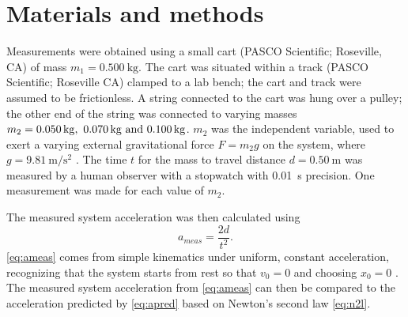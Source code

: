 ﻿\documentclass[reprint,amsmath,amssymb,aps]{revtex4-2}
\begin{document}
\section{Materials and methods}

Measurements were obtained using a small cart (PASCO Scientific; Roseville, CA) of mass $m_1=\qty{0.500}{\kilo\gram}$. The cart was situated within a track (PASCO Scientific; Roseville CA) clamped to a lab bench; the cart and track were assumed to be frictionless.  A string connected to the cart was hung over a pulley; the other end of the string was connected to varying masses $m_2=\qtylist{0.050;0.070;0.100}{\kilo\gram}$. $m_2$ was the independent variable, used to exert a varying external gravitational force $F=m_2 g$ on the system, where $g=\qty{9.81}{\meter\per\second\squared}$ \cite{tipler}. The time $t$ for the mass to travel distance $d=\qty{0.50}{\meter}$ was measured by a human observer with a stopwatch with \qty{0.01}{\second} precision. One measurement was made for each value of $m_2$.  

The measured system acceleration was then calculated using 
\begin{equation}
a_{meas} = \frac{2d}{t^2}.
\label{eq:ameas}
\end{equation}
\cref{eq:ameas} comes from simple kinematics under uniform, constant acceleration, recognizing that the system starts from rest so that $v_0=0$ and choosing $x_0=0$ \cite{tipler}.  The measured system acceleration from \cref{eq:ameas} can then be compared to the acceleration predicted by \cref{eq:apred} based on Newton's second law \cref{eq:n2l}. 
\end{document}
